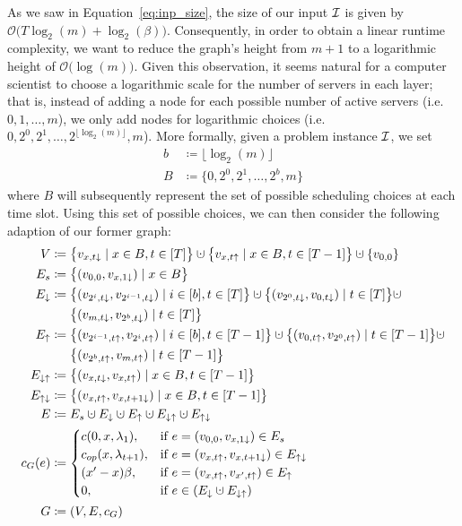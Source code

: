 As we saw in Equation~\eqref{eq:inp_size}, the size of our input $\mathcal{I}$ is given by $\mathcal{O}\bigl(T\log_2(m)+\log_2(\beta)\bigr)$. Consequently, in order to obtain a linear runtime complexity, we want to reduce the graph's height from $m+1$ to a logarithmic height of $\mathcal{O}\bigl(\log(m)\bigr)$. Given this observation, it seems natural for a computer scientist to choose a logarithmic scale for the number of servers in each layer; that is, instead of adding a node for each possible number of active servers (i.e.\ $0,1,\dotsc,m$), we only add nodes for logarithmic choices (i.e.\ $0,2^0,2^1,\dotsc,2^{\lfloor\log_2(m)\rfloor},m$). More formally, given a problem instance $\mathcal{I}$, we set
\begin{align*}
	b&\coloneqq\lfloor\log_2(m)\rfloor\\
	B&\coloneqq\{0,2^0,2^1,\dotsc,2^b,m\}
\end{align*}
where $B$ will subsequently represent the set of possible scheduling choices at each time slot. Using this set of possible choices, we can then consider the following adaption of our former graph:
\begin{align*}
	V&\coloneqq\bigl\{v_{x,t\downarrow}\mid x\in B,t\in[T]\bigr\}\dotcup\bigl\{v_{x,t\uparrow}\mid x\in B, t\in[T-1]\bigr\}\dotcup\{v_{0,0}\}\\
	E_s&\coloneqq\bigl\{(v_{0,0},v_{x,1\downarrow})\mid x\in B\bigr\}\\
	E_\downarrow&\coloneqq\bigl\{(v_{2^i,t\downarrow},v_{2^{i-1},t\downarrow})\mid i\in[b],t\in[T]\bigr\}\dotcup\bigl\{(v_{2^0,t\downarrow},v_{0,t\downarrow})\mid t\in[T]\bigr\}\dotcup\\
	&\phantom{{}\coloneqq{}}\bigl\{(v_{m,t\downarrow},v_{2^b,t\downarrow})\mid t\in[T]\bigr\}\\
	E_\uparrow&\coloneqq\bigl\{(v_{2^{i-1},t\uparrow},v_{2^i,t\uparrow})\mid i\in[b],t\in[T-1]\bigr\}\dotcup\bigl\{(v_{0,t\uparrow},v_{2^0,t\uparrow})\mid t\in[T-1]\bigr\}\dotcup\\
	&\phantom{{}\coloneqq{}}\bigl\{(v_{2^b,t\uparrow},v_{m,t\uparrow})\mid t\in[T-1]\bigr\}\\
	E_{\downarrow\uparrow}&\coloneqq\bigl\{(v_{x,t\downarrow},v_{x,t\uparrow})\mid x\in B,t\in[T-1]\bigr\}\\
	E_{\uparrow\downarrow}&\coloneqq\bigl\{(v_{x,t\uparrow},v_{x,t+1\downarrow})\mid x\in B,t\in[T-1]\bigr\}\\
	E&\coloneqq E_s\dotcup E_\downarrow\dotcup E_\uparrow\dotcup E_{\downarrow\uparrow}\dotcup E_{\uparrow\downarrow}\\
	c_G(e)&\coloneqq
	\begin{cases}
		\costs(0,x,\lambda_1), & \text{if $e=(v_{0,0},v_{x,1\downarrow})\in E_s$}\\
		\opcosts(x,\lambda_{t+1}), & \text{if $e=(v_{x,t\uparrow},v_{x,t+1\downarrow})\in E_{\uparrow\downarrow}$}\\
		(x'-x)\beta, & \text{if $e=(v_{x,t\uparrow},v_{x',t\uparrow})\in E_\uparrow$}\\
		0, & \text{if $e\in(E_\downarrow\dotcup E_{\downarrow\uparrow})$}
	\end{cases}\\
	G&\coloneqq(V,E,c_G)
\end{align*}
